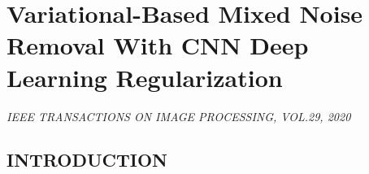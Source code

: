 \section{Variational-Based Mixed Noise Removal With CNN Deep Learning Regularization}

\begin{flushleft}
    \author{
    Faqiang Wang,
    Haiyang Huang,
    Jun Liu
    }
\end{flushleft}

\begin{center}
    \emph{IEEE TRANSACTIONS ON IMAGE PROCESSING, VOL.29, 2020}
\end{center}

\subsection{INTRODUCTION}